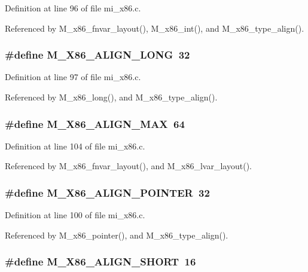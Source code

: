 Definition at line 96 of file mi\_\-x86.c.

Referenced by M\_\-x86\_\-fnvar\_\-layout(), M\_\-x86\_\-int(), and M\_\-x86\_\-type\_\-align().
\subsubsection{\setlength{\rightskip}{0pt plus 5cm}\#define M\_\-X86\_\-ALIGN\_\-LONG~32}\label{mi__x86_8c_4cd0e1c406b007a731b5b010a3bccc44}




Definition at line 97 of file mi\_\-x86.c.

Referenced by M\_\-x86\_\-long(), and M\_\-x86\_\-type\_\-align().
\subsubsection{\setlength{\rightskip}{0pt plus 5cm}\#define M\_\-X86\_\-ALIGN\_\-MAX~64}\label{mi__x86_8c_50903b6aab9fa1b6995d8ad7ae79fa79}




Definition at line 104 of file mi\_\-x86.c.

Referenced by M\_\-x86\_\-fnvar\_\-layout(), and M\_\-x86\_\-lvar\_\-layout().
\subsubsection{\setlength{\rightskip}{0pt plus 5cm}\#define M\_\-X86\_\-ALIGN\_\-POINTER~32}\label{mi__x86_8c_e84dc80e138c8fddf36bc9492610ebd5}




Definition at line 100 of file mi\_\-x86.c.

Referenced by M\_\-x86\_\-pointer(), and M\_\-x86\_\-type\_\-align().
\subsubsection{\setlength{\rightskip}{0pt plus 5cm}\#define M\_\-X86\_\-ALIGN\_\-SHORT~16}\label{mi__x86_8c_70b46b6869a5e5e6f87771d6c0bba725}




